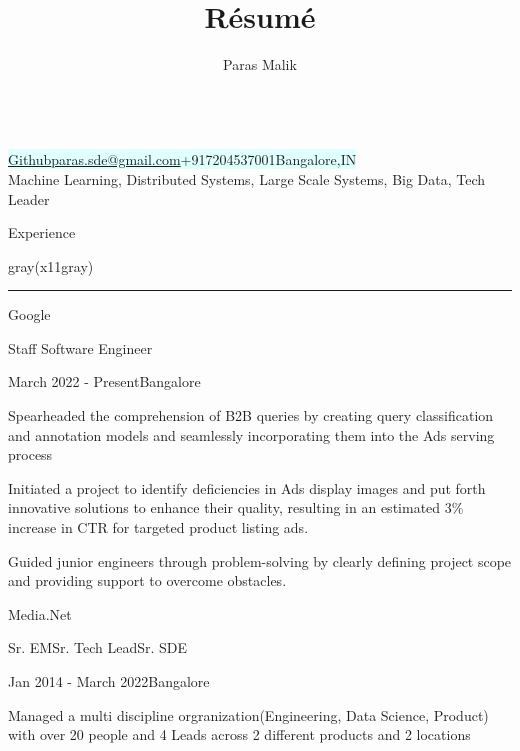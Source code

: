 \documentclass[8pt,a4paper]{article}
\makeatletter
\renewcommand{\maketitle}{
\begin{center}
{\Huge \bfseries
\theauthor} \vspace{.25em} \\
\colorbox{lightcyan}{
\href{http://github.com/i-plusplus}{Github}{\textbar}\href{mailto:paras.sde@gmail.com}{paras.sde@gmail.com}{\textbar}+917204537001{\textbar}Bangalore,IN
} 
\\
\normalsize{Machine Learning, Distributed Systems, Large Scale Systems, Big Data, Tech Leader}

\vspace{.5em}
\end{center}
}
\makeatother
\begin{document}
\title{R\'esum\'e}
\author{Paras Malik}
\maketitle
\begin{multicols}{2}
\setlength{\columnseprule}{0.4pt}
\begin{section}{Experience}
\end{section}

\begin{color}{gray(x11gray)}\hrule\end{color}
\vspace{5mm}
\begin{expsec}{Google}
\end{expsec}
\begin{expsubsec}{Staff Software Engineer}
\end{expsubsec}
\begin{timeandlocation}March 2022 - Present{\textbar}Bangalore
\end{timeandlocation}
\begin{desc}{Spearheaded the comprehension of B2B queries by creating query classification and annotation models and seamlessly incorporating them into the Ads serving process}
\end{desc}
\begin{desc}{Initiated a project to identify deficiencies in Ads display images and put forth innovative solutions to enhance their quality, resulting in an estimated 3\% increase in CTR for targeted product listing ads. }
\end{desc}
\begin{desc}{ Guided junior engineers through problem-solving by clearly defining project scope and providing support to overcome obstacles. }
\end{desc}
\begin{expsec}{Media.Net}
\end{expsec}
\begin{expsubsec}{Sr. EM{\textbar}Sr. Tech Lead{\textbar}Sr. SDE}
\end{expsubsec}
\begin{timeandlocation}Jan 2014 - March 2022{\textbar}Bangalore
\end{timeandlocation}
\begin{desc}{Managed a multi discipline orgranization(Engineering, Data Science, Product) with over 20 people and 4 Leads across 2 different products and 2 locations}

\end{desc}
\end{multicols}
\end{document}
